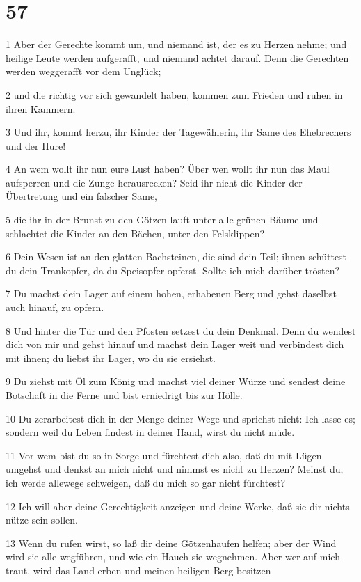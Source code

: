 \chapter{57}

\par 1 Aber der Gerechte kommt um, und niemand ist, der es zu Herzen nehme; und heilige Leute werden aufgerafft, und niemand achtet darauf. Denn die Gerechten werden weggerafft vor dem Unglück;
\par 2 und die richtig vor sich gewandelt haben, kommen zum Frieden und ruhen in ihren Kammern.
\par 3 Und ihr, kommt herzu, ihr Kinder der Tagewählerin, ihr Same des Ehebrechers und der Hure!
\par 4 An wem wollt ihr nun eure Lust haben? Über wen wollt ihr nun das Maul aufsperren und die Zunge herausrecken? Seid ihr nicht die Kinder der Übertretung und ein falscher Same,
\par 5 die ihr in der Brunst zu den Götzen lauft unter alle grünen Bäume und schlachtet die Kinder an den Bächen, unter den Felsklippen?
\par 6 Dein Wesen ist an den glatten Bachsteinen, die sind dein Teil; ihnen schüttest du dein Trankopfer, da du Speisopfer opferst. Sollte ich mich darüber trösten?
\par 7 Du machst dein Lager auf einem hohen, erhabenen Berg und gehst daselbst auch hinauf, zu opfern.
\par 8 Und hinter die Tür und den Pfosten setzest du dein Denkmal. Denn du wendest dich von mir und gehst hinauf und machst dein Lager weit und verbindest dich mit ihnen; du liebst ihr Lager, wo du sie ersiehst.
\par 9 Du ziehst mit Öl zum König und machst viel deiner Würze und sendest deine Botschaft in die Ferne und bist erniedrigt bis zur Hölle.
\par 10 Du zerarbeitest dich in der Menge deiner Wege und sprichst nicht: Ich lasse es; sondern weil du Leben findest in deiner Hand, wirst du nicht müde.
\par 11 Vor wem bist du so in Sorge und fürchtest dich also, daß du mit Lügen umgehst und denkst an mich nicht und nimmst es nicht zu Herzen? Meinst du, ich werde allewege schweigen, daß du mich so gar nicht fürchtest?
\par 12 Ich will aber deine Gerechtigkeit anzeigen und deine Werke, daß sie dir nichts nütze sein sollen.
\par 13 Wenn du rufen wirst, so laß dir deine Götzenhaufen helfen; aber der Wind wird sie alle wegführen, und wie ein Hauch sie wegnehmen. Aber wer auf mich traut, wird das Land erben und meinen heiligen Berg besitzen

